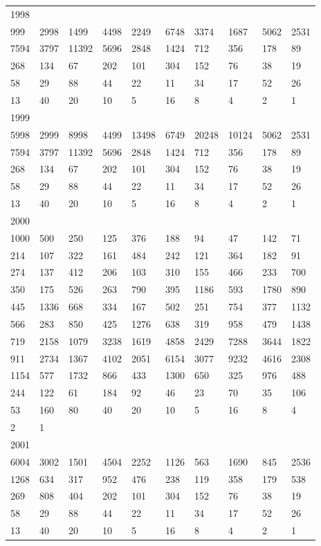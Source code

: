 \begin{longtable}{*{10}{l}}
1998&&&&&&&&&\\
999& 2998& 1499& 4498& 2249& 6748& 3374& 1687& 5062& 2531\\
7594& 3797& 11392& 5696& 2848& 1424& 712& 356& 178& 89\\
268& 134& 67& 202& 101& 304& 152& 76& 38& 19\\
58& 29& 88& 44& 22& 11& 34& 17& 52& 26\\
13& 40& 20& 10& 5& 16& 8& 4& 2& 1\\

1999&&&&&&&&&\\
5998& 2999& 8998& 4499& 13498& 6749& 20248& 10124& 5062& 2531\\
7594& 3797& 11392& 5696& 2848& 1424& 712& 356& 178& 89\\
268& 134& 67& 202& 101& 304& 152& 76& 38& 19\\
58& 29& 88& 44& 22& 11& 34& 17& 52& 26\\
13& 40& 20& 10& 5& 16& 8& 4& 2& 1\\

2000&&&&&&&&&\\
1000& 500& 250& 125& 376& 188& 94& 47& 142& 71\\
214& 107& 322& 161& 484& 242& 121& 364& 182& 91\\
274& 137& 412& 206& 103& 310& 155& 466& 233& 700\\
350& 175& 526& 263& 790& 395& 1186& 593& 1780& 890\\
445& 1336& 668& 334& 167& 502& 251& 754& 377& 1132\\
566& 283& 850& 425& 1276& 638& 319& 958& 479& 1438\\
719& 2158& 1079& 3238& 1619& 4858& 2429& 7288& 3644& 1822\\
911& 2734& 1367& 4102& 2051& 6154& 3077& 9232& 4616& 2308\\
1154& 577& 1732& 866& 433& 1300& 650& 325& 976& 488\\
244& 122& 61& 184& 92& 46& 23& 70& 35& 106\\
53& 160& 80& 40& 20& 10& 5& 16& 8& 4\\
2& 1& \\

2001&&&&&&&&&\\
6004& 3002& 1501& 4504& 2252& 1126& 563& 1690& 845& 2536\\
1268& 634& 317& 952& 476& 238& 119& 358& 179& 538\\
269& 808& 404& 202& 101& 304& 152& 76& 38& 19\\
58& 29& 88& 44& 22& 11& 34& 17& 52& 26\\
13& 40& 20& 10& 5& 16& 8& 4& 2& 1\\


\end{longtable}
